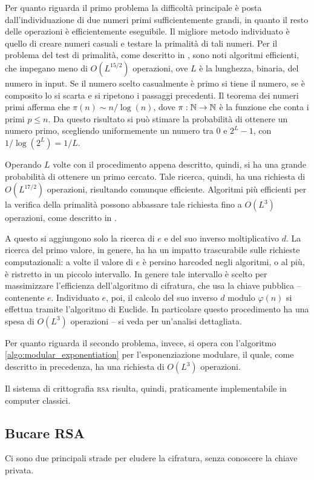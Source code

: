Per quanto riguarda il primo problema la difficoltà principale è posta dall'individuazione di due numeri primi sufficientemente grandi, in quanto il resto delle operazioni è efficientemente eseguibile.
Il migliore metodo individuato è quello di creare numeri casuali e testare la primalità di tali numeri.
Per il problema del test di primalità, come descritto in \cite{Article:PRIMESinP}, sono noti algoritmi efficienti, che impegano meno di $O(L^{15/2})$ operazioni, ove $L$ è la lunghezza, binaria, del numero in input.
Se il numero scelto casualmente è primo si tiene il numero, se è composito lo si scarta e si ripetono i passaggi precedenti.
Il teorema dei numeri primi afferma che $\pi(n) \sim n/\log(n)$, dove $\pi: \mathbb{N} \to \mathbb{N}$ è la funzione che conta i primi $p \leq n$.
Da questo risultato si può stimare la probabilità di ottenere un numero primo, scegliendo uniformemente un numero tra $0$ e $2^L-1$, con $1/\log(2^L) = 1/L$.

Operando $L$ volte con il procedimento appena descritto, quindi, si ha una grande probabilità di ottenere un primo cercato.
Tale ricerca, quindi, ha una richiesta di $O(L^{17/2})$ operazioni, risultando comunque efficiente.
Algoritmi più efficienti per la verifica della primalità possono abbassare tale richiesta fino a $O(L^3)$ operazioni, come descritto in \cite{Book:QCQI}.

A questo si aggiungono solo la ricerca di $e$ e del suo inverso moltiplicativo $d$.
La ricerca del primo valore, in genere, ha ha un impatto trascurabile sulle richieste computazionali: a volte il valore di $e$ è persino harcoded negli algoritmi, o al più, è ristretto in un piccolo intervallo.
In genere tale intervallo è scelto per massimizzare l'efficienza dell'algoritmo di cifratura, che usa la chiave pubblica -- contenente $e$.
Individuato $e$, poi, il calcolo del suo inverso $d$ modulo $\varphi(n)$ si effettua tramite l'algoritmo di Euclide.
In particolare questo procedimento ha una spesa di $O(L^3)$ operazioni -- si veda \cite{Book:Knuth_2} per un'analisi dettagliata.

Per quanto riguarda il secondo problema, invece, si opera con l'algoritmo \ref{algo:modular_exponentiation} per l'esponenziazione modulare, il quale, come descritto in precedenza, ha una richiesta di $O(L^3)$ operazioni.

Il sistema di crittografia \textsc{rsa} risulta, quindi, praticamente implementabile in computer classici.

\subsection{Bucare RSA}
Ci sono due principali strade per eludere la cifratura, senza conoscere la chiave privata.

